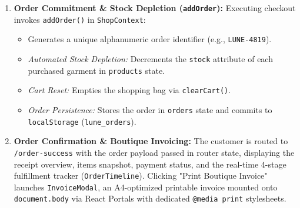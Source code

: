 \documentclass[12pt,a4paper,oneside]{report}
\begin{document}
\begin{enumerate}[leftmargin=1.2cm]
    \begin{itemize}[nosep]
        \item \textit{International Credit / Debit Card (USD Standard):} Interactive luxury card simulation (Visa, Mastercard, AMEX) complete with cardholder name, card number, expiry, and CVV fields conforming to 256-bit SSL interface guidelines.
        \item \textit{Vietnam Domestic Bank Transfer (VietQR -- VND):} Real-time currency conversion ($1.00\text{ USD} \approx 25,400\text{ VND}$), dynamically generating an official Napas 24/7 QR code via \texttt{api.vietqr.io} embedded with recipient MB Bank account \texttt{0988888888}, account holder \texttt{LUNE ATELIER STORE}, converted amount, and unique order memo (\texttt{orderMemo}), accompanied by 1-click clipboard copying.
        \item \textit{Cash on Delivery (COD):} Standard post-inspection cash settlement on arrival.
    \end{itemize}
    \item \textbf{Order Commitment \& Stock Depletion (\texttt{addOrder}):}
    Executing checkout invokes \texttt{addOrder()} in \texttt{ShopContext}:
    \begin{itemize}[nosep]
        \item Generates a unique alphanumeric order identifier (e.g., \texttt{LUNE-4819}).
        \item \textit{Automated Stock Depletion:} Decrements the \texttt{stock} attribute of each purchased garment in \texttt{products} state.
        \item \textit{Cart Reset:} Empties the shopping bag via \texttt{clearCart()}.
        \item \textit{Order Persistence:} Stores the order in \texttt{orders} state and commits to \texttt{localStorage} (\texttt{lune\_orders}).
    \end{itemize}
    \item \textbf{Order Confirmation \& Boutique Invoicing:}
    The customer is routed to \texttt{/order-success} with the order payload passed in router state, displaying the receipt overview, items snapshot, payment status, and the real-time 4-stage fulfillment tracker (\texttt{OrderTimeline}). Clicking "Print Boutique Invoice" launches \texttt{InvoiceModal}, an A4-optimized printable invoice mounted onto \texttt{document.body} via React Portals with dedicated \texttt{@media print} stylesheets.
\end{enumerate}
\end{document}
